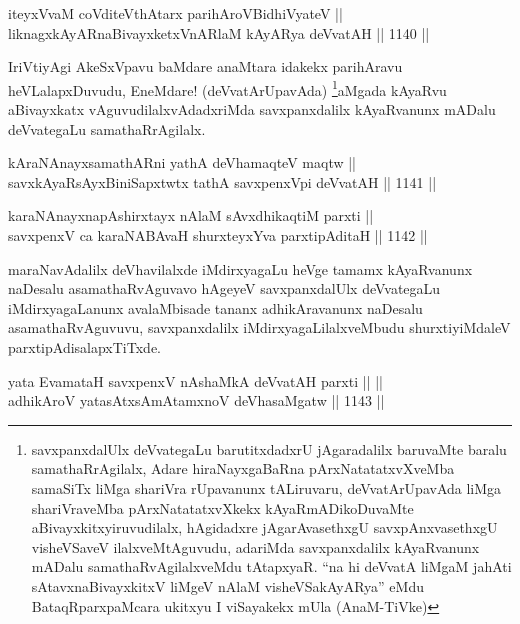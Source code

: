 \begin{shl}
iteyxVvaM coVditeV\s thAtarx parihAroV\s BidhiVyateV || \\
liknagxkAyARnaBivayxketxVnARlaM kAyARya deVvatAH ||  1140 ||  
\end{shl}

\begin{artha}
IriVtiyAgi AkeSxVpavu baMdare anaMtara idakekx parihAravu heVLalapxDuvudu, EneMdare! (deVvatArUpavAda) \footnote{savxpanxdalUlx deVvategaLu barutitxdadxrU jAgaradalilx baruvaMte baralu samathaRrAgilalx, Adare hiraNayxgaBaRna pArxNatatatxvXveMba samaSiTx liMga shariVra rUpavanunx tALiruvaru, deVvatArUpavAda liMga shariVraveMba pArxNatatatxvXkekx kAyaRmADikoDuvaMte aBivayxkitxyiruvudilalx, hAgidadxre jAgarAvasethxgU savxpAnxvasethxgU visheVSaveV ilalxveMtAguvudu, adariMda savxpanxdalilx kAyaRvanunx mADalu samathaRvAgilalxveMdu tAtapxyaR. ``na hi deVvatA liMgaM jahAti sAtavxnaBivayxkitxV liMgeV nAlaM visheVSakAyARya'' eMdu BataqRparxpaMcara ukitxyu I viSayakekx mUla (AnaM-TiVke)}aMgada kAyaRvu aBivayxkatx vAguvudilalxvAdadxriMda savxpanxdalilx kAyaRvanunx mADalu deVvategaLu samathaRrAgilalx.
\end{artha}


\begin{shl}
kAraNAnayxsamathARni yathA deVhamaqteV maqtw || \\
savxkAyaRsAyxBiniSapxtwtx tathA savxpenxV\s pi deVvatAH ||  1141 ||  
\end{shl}
				
\begin{shl}
karaNAnayxnapAshirxtayx nAlaM sAvxdhikaqtiM parxti ||  \\
savxpenxV ca karaNABAvaH shurxteyxYva parxtipAditaH ||  1142 ||  
\end{shl}

\begin{artha}
maraNavAdalilx deVhavilalxde iMdirxyagaLu heVge tamamx kAyaRvanunx naDesalu asamathaRvAguvavo hAgeyeV savxpanxdalUlx deVvategaLu iMdirxyagaLanunx avalaMbisade tananx adhikAravanunx naDesalu asamathaRvAguvuvu, savxpanxdalilx iMdirxyagaLilalxveMbudu shurxtiyiMdaleV parxtipAdisalapxTiTxde.
\end{artha}

\begin{shl}
yata EvamataH savxpenxV nA\s \s shaMkA deVvatAH parxti ||  || \\
adhikAroV yatasAtxsAmAtamxnoV deVhasaMgatw ||  1143 ||  
\end{shl}

